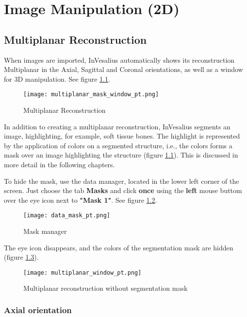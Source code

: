 \chapter{Image Manipulation (2D)}

\section{Multiplanar Reconstruction}

When images are imported, InVesalius automatically shows its reconstruction
Multiplanar in the Axial, Sagittal and Coronal orientations, as well as a window for 3D manipulation.
See figure \ref{fig:mpr}.

\begin{figure}[!htb]
\centering
\texttt{[image: multiplanar\_mask\_window\_pt.png]}
\caption{Multiplanar Reconstruction}
\label{fig:mpr}
\end{figure}

\newpage

In addition to creating a multiplanar reconstruction, InVesalius segments an image, highlighting, for example, soft tissue bones. The highlight is represented by the application of colors on a segmented structure, i.e., the colors forms a mask over an image highlighting the structure (figure \ref{fig:mpr}). This is discussed in more detail in the following chapters.


To hide the mask, use the data manager, located in the lower left corner
of the screen. Just choose the tab \textbf{Masks} and click \textbf{once} using the
\textbf{left} mouse buttom over the eye icon next to \textbf{"Mask 1"}. See figure
\ref{fig:ger_masc}.

\begin{figure}[!htb]
\centering
\texttt{[image: data\_mask\_pt.png]}
\caption{Mask manager}
\label{fig:ger_masc}
\end{figure}

The eye icon disappears, and the colors of the segmentation mask are hidden (figure
\ref{fig:mpr_sem_mask}).

\begin{figure}[!htb]
\centering
\texttt{[image: multiplanar\_window\_pt.png]}
\caption{Multiplanar reconstruction without segmentation mask}
\label{fig:mpr_sem_mask}
\end{figure}

\subsection{Axial orientation}

